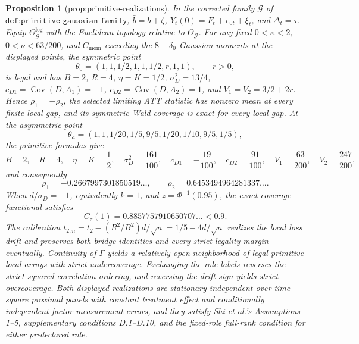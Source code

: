 \documentclass{article}
\newtheorem{proposition}{Proposition}
\begin{document}
\begin{proposition}[prop:primitive-realizations]\label{prop:primitive-realizations}
In the corrected family \(\mathcal G\) of \(\texttt{def:primitive-gaussian-family}\), \(\bar b=b+\zeta\), \(Y_t(0)=F_t+e_{0t}+\xi_t\), and \(\Delta_t=\tau\).  Equip \(\Theta_{\mathcal G}^{\mathrm{leg}}\) with the Euclidean topology relative to \(\Theta_{\mathcal G}\).  For any fixed \(0<\kappa<2\), \(0<\nu<63/200\), and \(C_{\mathrm{mom}}\) exceeding the \(8+\delta_0\) Gaussian moments at the displayed points, the symmetric point
\[
 \theta_0=(1,1,1/2,1,1,1/2,r,1,1),\qquad r>0,
\]
is legal and has \(B=2\), \(R=4\), \(\eta=K=1/2\), \(\sigma_D^2=13/4\), \(c_{D1}=\operatorname{Cov}(D,A_1)=-1\), \(c_{D2}=\operatorname{Cov}(D,A_2)=1\), and \(V_1=V_2=3/2+2r\).  Hence \(\rho_1=-\rho_2\), the selected limiting ATT statistic has nonzero mean at every finite local gap, and its symmetric Wald coverage is exact for every local gap.  At the asymmetric point
\[
 \theta_a=(1,1,1/20,1/5,9/5,1/20,1/10,9/5,1/5),
\]
the primitive formulas give
\[
 B=2,\quad R=4,\quad \eta=K=\frac12,\quad
 \sigma_D^2=\frac{161}{100},\quad
 c_{D1}=-\frac{19}{100},\quad c_{D2}=\frac{91}{100},\quad
 V_1=\frac{63}{200},\quad V_2=\frac{247}{200},
\]
and consequently
\[
 \rho_1=-0.2667997301850519\ldots,
 \qquad
 \rho_2=0.6453494964281337\ldots .
\]
When \(d/\sigma_D=-1\), equivalently \(k=1\), and \(z=\Phi^{-1}(0.95)\), the exact coverage functional satisfies
\[
 C_z(1)=0.8857757910650707\ldots<0.9.
\]
The calibration \(t_{2,n}=t_2-(R^2/B^2)d/\sqrt n=1/5-4d/\sqrt n\) realizes the local loss drift and preserves both bridge identities and every strict legality margin eventually.  Continuity of \(\Gamma\) yields a relatively open neighborhood of legal primitive local arrays with strict undercoverage.  Exchanging the role labels reverses the strict squared-correlation ordering, and reversing the drift sign yields strict overcoverage.  Both displayed realizations are stationary independent-over-time square proximal panels with constant treatment effect and conditionally independent factor-measurement errors, and they satisfy Shi et al.'s Assumptions 1--5, supplementary conditions D.1--D.10, and the fixed-role full-rank condition for either predeclared role.
\end{proposition}
\end{document}
